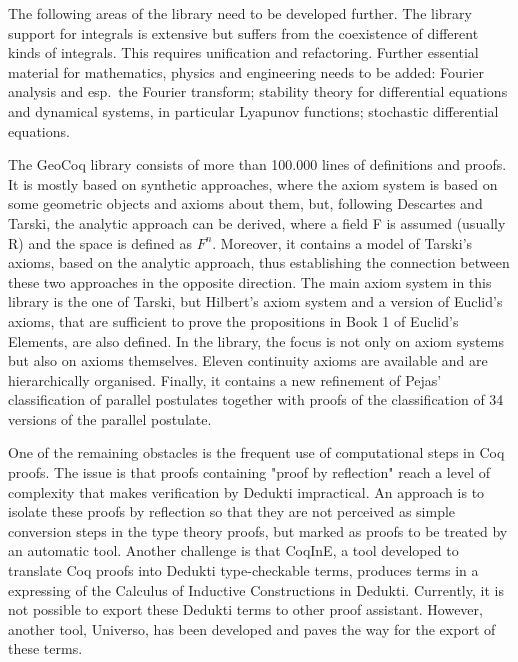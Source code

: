 \begin{workpackage}[id=libraries,type=RTD,wphases=1-48,
  short={Large libraries},%
  title={Large libraries},
  lead=Tum,
  StrRM=18,
  ChaRM=12,
  TumRM=27]
\begin{tasklist}
\begin{task}[
  id=isaAnalysisProb,
  title=The Isabelle Analysis \& Probability Theory library,
  shorttitle=Isa. A\&P,
  lead=Tum,
  TumRM=24,
  wphases=1-24]
The following areas of the library need to be developed further. The
library support for integrals is extensive but suffers from the
coexistence of different kinds of integrals. This requires unification
and refactoring. Further essential material for mathematics, physics
and engineering needs to be added: Fourier
analysis and esp.\ the Fourier transform; stability theory for
differential equations and dynamical systems, in particular Lyapunov
functions; stochastic differential equations.
\end{task}

\begin{task}[
  id=geocoq,
  title=The GeoCoq library,
  shorttitle=GeoCoq,
  lead=Str,
  StrRM=18,
  wphases=1-18]
%
The GeoCoq library consists of more than 100.000 lines of definitions
and proofs. It is mostly based on synthetic approaches, where the
axiom system is based on some geometric objects and axioms about them,
but, following Descartes and Tarski, the analytic approach can be
derived, where a field F is assumed (usually R) and the space is
defined as $F^n$. Moreover, it contains a model of Tarski's axioms,
based on the analytic approach, thus establishing the connection
between these two approaches in the opposite direction. The main axiom
system in this library is the one of Tarski, but Hilbert's axiom
system and a version of Euclid's axioms, that are sufficient to prove the
propositions in Book 1 of Euclid's Elements, are also defined. In the
library, the focus is not only on axiom systems but also on axioms
themselves. Eleven continuity axioms are available and are
hierarchically organised. Finally, it contains a new refinement of
Pejas’ classification of parallel postulates together with proofs of
the classification of 34 versions of the parallel postulate.

One of the remaining obstacles is the frequent use of computational steps in Coq proofs. The issue is that proofs containing "proof by reflection" reach a level of complexity that makes verification by Dedukti impractical. An approach is to isolate these proofs by reflection so that they are not perceived as simple conversion steps in the type theory proofs, but marked as proofs to be treated by an automatic tool. Another challenge is that CoqInE, a tool developed to translate Coq proofs into Dedukti type-checkable terms, produces terms in a expressing of the Calculus of Inductive Constructions in Dedukti. Currently, it is not possible to export these Dedukti terms to other proof assistant. However, another tool, Universo, has been developed and paves the way for the export of these terms.
\end{task}


\end{tasklist}
\end{workpackage}
